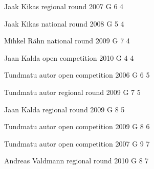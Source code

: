 \documentclass[11pt]{article}
\begin{document}
\ylDisplay{} %
{Jaak Kikas} %
{regional round} %
{2007} %
{G 6} %
{4} %
{

\ifEngStatement
\fi
}

\ylDisplay{} %
{Jaak Kikas} %
{national round} %
{2008} %
{G 5} %
{4} %
{

\ifEngStatement
\fi
}

\ylDisplay{} %
{Mihkel Rähn} %
{national round} %
{2009} %
{G 7} %
{4} %
{

\ifEngStatement
\fi
}

\ylDisplay{} %
{Jaan Kalda} %
{open competition} %
{2010} %
{G 4} %
{4} %
{

\ifEngStatement
\fi
}

\ylDisplay{} %
{Tundmatu autor} %
{open competition} %
{2006} %
{G 6} %
{5} %
{

\ifEngStatement
\fi
}

\ylDisplay{} %
{Tundmatu autor} %
{regional round} %
{2009} %
{G 7} %
{5} %
{

\ifEngStatement
\fi
}

\ylDisplay{} %
{Jaan Kalda} %
{regional round} %
{2009} %
{G 8} %
{5} %
{

\ifEngStatement
\fi
}

\ylDisplay{} %
{Tundmatu autor} %
{open competition} %
{2009} %
{G 8} %
{6} %
{

\ifEngStatement
\fi
}

\ylDisplay{} %
{Tundmatu autor} %
{open competition} %
{2007} %
{G 9} %
{7} %
{

\ifEngStatement
\fi
}

\ylDisplay{} %
{Andreas Valdmann} %
{regional round} %
{2010} %
{G 8} %
{7} %
{

\ifEngStatement
\fi
}
\end{document}
